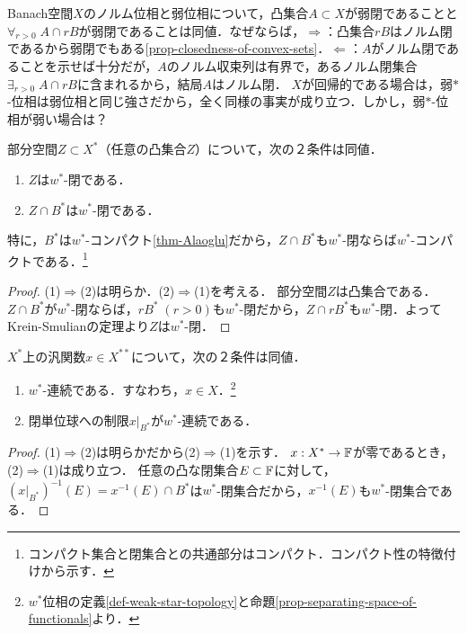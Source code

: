 \documentclass[uplatex,dvipdfmx]{jsreport}
\begin{document}
\begin{remarks}
    Banach空間$X$のノルム位相と弱位相について，凸集合$A\subset X$が弱閉であることと$\forall_{r>0}\;A\cap rB$が弱閉であることは同値．なぜならば，$\Rightarrow$：凸集合$rB$はノルム閉であるから弱閉でもある\ref{prop-closedness-of-convex-sets}．$\Leftarrow$：$A$がノルム閉であることを示せば十分だが，$A$のノルム収束列は有界で，あるノルム閉集合$\exists_{r>0}\;A\cap rB$に含まれるから，結局$A$はノルム閉．
    $X$が回帰的である場合は，弱$*$-位相は弱位相と同じ強さだから，全く同様の事実が成り立つ．しかし，弱$*$-位相が弱い場合は？
\end{remarks}

\begin{corollary}
    部分空間$Z\subset X^*$（任意の凸集合$Z$）について，次の２条件は同値．
    \begin{enumerate}
        \item $Z$は$w^*$-閉である．
        \item $Z\cap B^*$は$w^*$-閉である．
    \end{enumerate}
    特に，$B^*$は$w^*$-コンパクト\ref{thm-Alaoglu}だから，$Z\cap B^*$も$w^*$-閉ならば$w^*$-コンパクトである．\footnote{コンパクト集合と閉集合との共通部分はコンパクト．コンパクト性の特徴付けから示す．}
\end{corollary}
\begin{proof}
    (1)$\Rightarrow$(2)は明らか．(2)$\Rightarrow$(1)を考える．
    部分空間$Z$は凸集合である．
    $Z\cap B^*$が$w^*$-閉ならば，$rB^*\;(r>0)$も$w^*$-閉だから，$Z\cap rB^*$も$w^*$-閉．よってKrein-Smulianの定理より$Z$は$w^*$-閉．
\end{proof}

\begin{corollary}\label{cor-characterization-of-weak-star-continuousness}
    $X^*$上の汎関数$x\in X^{**}$について，次の２条件は同値．
    \begin{enumerate}
        \item $w^*$-連続である．すなわち，$x\in X$．\footnote{$w^*$位相の定義\ref{def-weak-star-topology}と命題\ref{prop-separating-space-of-functionals}より．}
        \item 閉単位球への制限$x|_{B^*}$が$w^*$-連続である．
    \end{enumerate}
\end{corollary}
\begin{proof}
    (1)$\Rightarrow$(2)は明らかだから(2)$\Rightarrow$(1)を示す．
    $x:X^*\to\mathbb{F}$が零であるとき，(2)$\Rightarrow$(1)は成り立つ．
    任意の凸な閉集合$E\subset\mathbb{F}$に対して，$(x|_{B^*})^{-1}(E)=x^{-1}(E)\cap B^*$は$w^*$-閉集合だから，$x^{-1}(E)$も$w^*$-閉集合である．
\end{proof}
\end{document}

